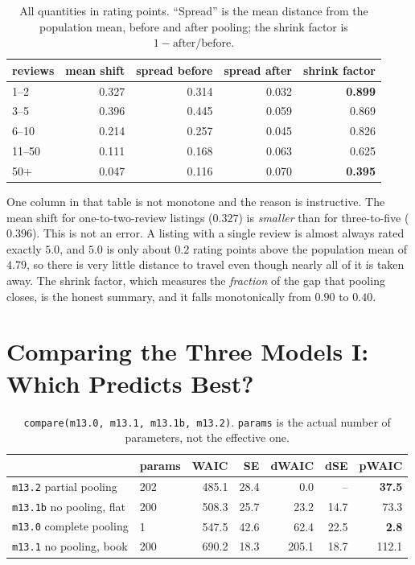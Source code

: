 \documentclass[11pt,a4paper]{article}
\begin{document}
\begin{table}[h!]
\centering
\begin{tabular}{lrrrr}
\toprule
reviews & mean shift & spread before & spread after & \textbf{shrink factor} \\
\midrule
1--2   & 0.327 & 0.314 & 0.032 & \textbf{0.899} \\
3--5   & 0.396 & 0.445 & 0.059 & 0.869 \\
6--10  & 0.214 & 0.257 & 0.045 & 0.826 \\
11--50 & 0.111 & 0.168 & 0.063 & 0.625 \\
50+    & 0.047 & 0.116 & 0.070 & \textbf{0.395} \\
\bottomrule
\end{tabular}
\caption{All quantities in rating points. ``Spread'' is the mean distance from
the population mean, before and after pooling; the shrink factor is
$1 - \text{after}/\text{before}$.}
\end{table}

One column in that table is not monotone and the reason is instructive. The
mean shift for one-to-two-review listings ($0.327$) is \emph{smaller} than for
three-to-five ($0.396$). This is not an error. A listing with a single review is
almost always rated exactly $5.0$, and $5.0$ is only about $0.2$ rating points
above the population mean of $4.79$, so there is very little distance to travel
even though nearly all of it is taken away. The shrink factor, which measures
the \emph{fraction} of the gap that pooling closes, is the honest summary, and
it falls monotonically from $0.90$ to $0.40$.

\section{Comparing the Three Models I: Which Predicts Best?}

\begin{table}[h!]
\centering
\begin{tabular}{llrrrrr}
\toprule
 & params & WAIC & SE & dWAIC & dSE & \textbf{pWAIC} \\
\midrule
\texttt{m13.2}  partial pooling   & 202 & 485.1 & 28.4 &   0.0 & --   & \textbf{37.5} \\
\texttt{m13.1b} no pooling, flat  & 200 & 508.3 & 25.7 &  23.2 & 14.7 & 73.3 \\
\texttt{m13.0}  complete pooling  & 1   & 547.5 & 42.6 &  62.4 & 22.5 & \textbf{2.8} \\
\texttt{m13.1}  no pooling, book  & 200 & 690.2 & 18.3 & 205.1 & 18.7 & 112.1 \\
\bottomrule
\end{tabular}
\caption{\texttt{compare(m13.0, m13.1, m13.1b, m13.2)}. \texttt{params} is the
actual number of parameters, not the effective one.}
\label{tab:waic}
\end{table}
\end{document}
